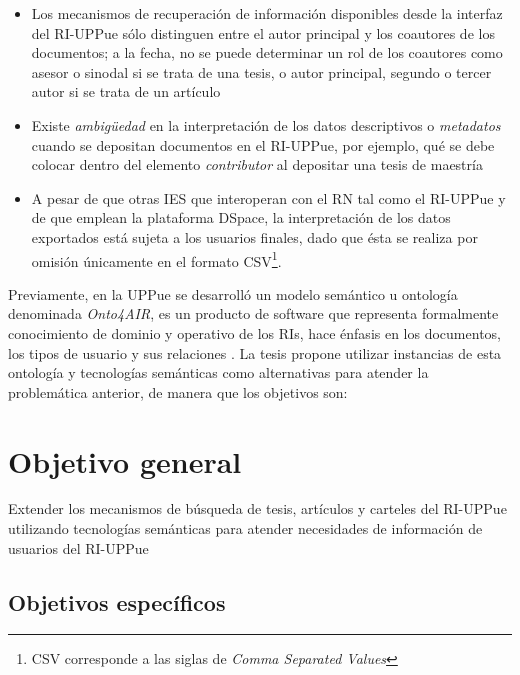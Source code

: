 \begin{itemize}
\item Los mecanismos de recuperaci\'on de informaci\'on disponibles desde la interfaz del RI-UPPue s\'olo distinguen entre el autor principal y los coautores de los documentos; a la fecha, no se puede determinar un rol de los coautores como asesor o sinodal si se trata de una tesis, o autor principal, segundo o tercer autor si se trata de un art\'iculo

\item  Existe \textit{ambig\"{u}edad} en la interpretaci\'on de los datos descriptivos o \emph{metadatos} cuando se depositan documentos en el RI-UPPue, por ejemplo, qu\'e se debe colocar dentro del elemento \emph{contributor} al depositar una tesis de maestr\'ia

\item A pesar de que otras IES que interoperan con el RN tal como el RI-UPPue y de que emplean la plataforma DSpace, la interpretaci\'on de los datos exportados est\'a sujeta a los usuarios finales, dado que \'esta se realiza por omisi\'on \'unicamente en el formato CSV\footnote{CSV corresponde a las siglas de \emph{Comma Separated Values}}.

\end{itemize}

Previamente, en la UPPue se desarroll\'o un modelo sem\'antico u ontolog\'ia denominada  \emph{Onto4AIR}, es un producto de software que representa formalmente conocimiento de dominio y operativo de los RIs, hace \'enfasis en los documentos, los tipos de usuario y sus relaciones \cite{representacionSemantica}. La tesis propone utilizar instancias de esta ontolog\'ia y tecnolog\'ias sem\'anticas como alternativas para atender la problem\'atica anterior, de manera que los objetivos son: 

\section{Objetivo general} 
Extender los mecanismos de b\'usqueda de tesis, art\'iculos y carteles del RI-UPPue utilizando tecnolog\'ias sem\'anticas para atender necesidades de informaci\'on de usuarios del RI-UPPue

\subsection{Objetivos espec\'ificos}

